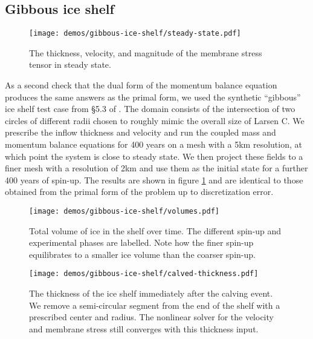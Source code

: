 \documentclass{article}
\theoremstyle{definition}
\theoremstyle{plain}
\begin{document}
\subsection{Gibbous ice shelf} \label{sec:gibbous-ice-shelf}

\begin{figure}[t]
    \begin{center}
        \texttt{[image: demos/gibbous-ice-shelf/steady-state.pdf]}
    \end{center}
    \caption{The thickness, velocity, and magnitude of the membrane stress tensor in steady state.}
    \label{fig:gibbous}
\end{figure}

As a second check that the dual form of the momentum balance equation produces the same answers as the primal form, we used the synthetic ``gibbous'' ice shelf test case from \S5.3 of \citet{shapero2021icepack}.
The domain consists of the intersection of two circles of different radii chosen to roughly mimic the overall size of Larsen C.
We prescribe the inflow thickness and velocity and run the coupled mass and momentum balance equations for 400 years on a mesh with a 5km resolution, at which point the system is close to steady state.
We then project these fields to a finer mesh with a resolution of 2km and use them as the initial state for a further 400 years of spin-up.
The results are shown in figure \ref{fig:gibbous} and are identical to those obtained from the primal form of the problem up to discretization error.

\begin{figure}[t]
    \begin{center}
        \texttt{[image: demos/gibbous-ice-shelf/volumes.pdf]}
    \end{center}
    \caption{Total volume of ice in the shelf over time.
    The different spin-up and experimental phases are labelled.
    Note how the finer spin-up equilibrates to a smaller ice volume than the coarser spin-up.}
    \label{fig:gibbous-calving-volumes}
\end{figure}

\begin{figure}[t]
    \begin{center}
        \texttt{[image: demos/gibbous-ice-shelf/calved-thickness.pdf]}
    \end{center}
    \caption{The thickness of the ice shelf immediately after the calving event.
    We remove a semi-circular segment from the end of the shelf with a prescribed center and radius.
    The nonlinear solver for the velocity and membrane stress still converges with this thickness input.}
    \label{fig:gibbous-calving-thickness}
\end{figure}
\end{document}
